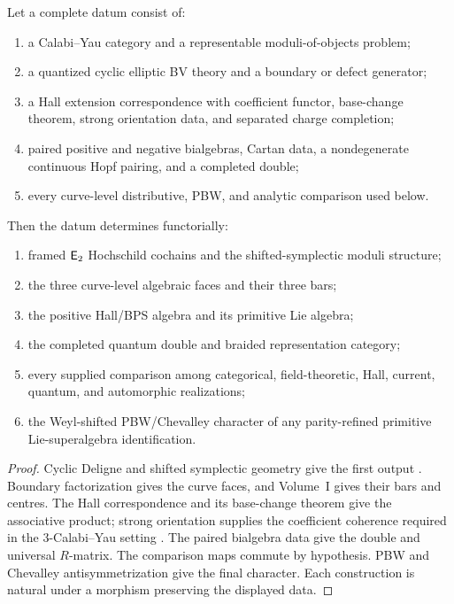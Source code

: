 \begin{theorem}
Let a complete datum consist of:
\begin{enumerate}
\item a Calabi--Yau category and a representable moduli-of-objects problem;
\item a quantized cyclic elliptic BV theory and a boundary or defect generator;
\item a Hall extension correspondence with coefficient functor, base-change theorem, strong orientation data, and separated charge completion;
\item paired positive and negative bialgebras, Cartan data, a nondegenerate continuous Hopf pairing, and a completed double;
\item every curve-level distributive, PBW, and analytic comparison used below.
\end{enumerate}
Then the datum determines functorially:
\begin{enumerate}
\item framed $\mathsf E_2$ Hochschild cochains and the shifted-symplectic moduli structure;
\item the three curve-level algebraic faces and their three bars;
\item the positive Hall/BPS algebra and its primitive Lie algebra;
\item the completed quantum double and braided representation category;
\item every supplied comparison among categorical, field-theoretic, Hall, current, quantum, and automorphic realizations;
\item the Weyl-shifted PBW/Chevalley character of any parity-refined primitive Lie-superalgebra identification.
\end{enumerate}
\end{theorem}
\begin{proof}
Cyclic Deligne and shifted symplectic geometry give the first output \cite{BravRozenblyum,PTVV,BravDyckerhoff}.  Boundary factorization gives the curve faces, and Volume~I gives their bars and centres.  The Hall correspondence and its base-change theorem give the associative product; strong orientation supplies the coefficient coherence required in the $3$-Calabi--Yau setting \cite{KPS}.  The paired bialgebra data give the double and universal $R$-matrix.  The comparison maps commute by hypothesis.  PBW and Chevalley antisymmetrization give the final character.  Each construction is natural under a morphism preserving the displayed data.
\end{proof}

